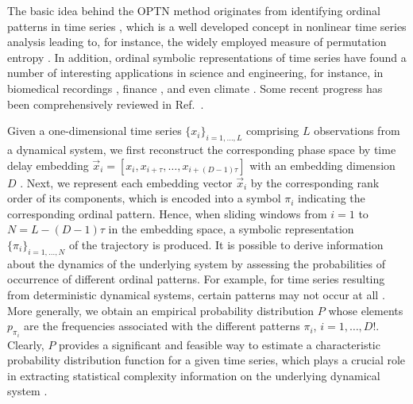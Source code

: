 \documentclass[12pt,aip,cha,reprint,nofootinbib]{revtex4-1}
\begin{document}
The basic idea behind the OPTN method originates from identifying ordinal patterns in time series \cite{BandtPRL2002}, which is a well developed concept in nonlinear time series analysis leading to, for instance, the widely employed measure of permutation entropy \cite{BandtPRL2002}. In addition, ordinal symbolic representations of time series have found a number of interesting applications in science and engineering, for instance, in biomedical recordings \cite{AmigoPTRSA2014}, finance \cite{ZaninChaos2008}, and even climate \cite{BarreiroChaos2011}. Some recent progress has been comprehensively reviewed in Ref.~\cite{AmigoPTRSA2014}. 

Given a one-dimensional time series $\{ x_i\}_{i=1, \ldots, L}$ comprising $L$ observations from a dynamical system, we first reconstruct the corresponding phase space by time delay embedding $\vec{x}_i = [x_i, x_{i+\tau}, \ldots, x_{i+(D-1)\tau}]$ with an embedding dimension $D$ \cite{Takens1981,Kantz97}. Next, we represent each embedding vector $\vec{x}_i$ by the corresponding rank order of its components, which is encoded into a symbol $\pi_{i}$ indicating the corresponding ordinal pattern. Hence, when sliding windows from $i=1$ to $N = L - (D - 1)\tau$ in the embedding space, a symbolic representation $\{\pi_i\}_{i=1, \ldots, N}$ of the trajectory is produced. It is possible to derive information about the dynamics of the underlying system by assessing the probabilities of occurrence of different ordinal patterns. For example, for time series resulting from deterministic dynamical systems, certain patterns may not occur at all \cite{AmigoEPL2007,AmigoEPL2008,ZaninChaos2008,RossoEPJB2012}. More generally, we obtain an empirical probability distribution $P$ whose elements $p_{\pi_{i}}$ are the frequencies associated with the different patterns $\pi_{i}$, $i = 1, \ldots, D!$. Clearly, $P$ provides a significant and feasible way to estimate a characteristic probability distribution function for a given time series, which plays a crucial role in extracting statistical complexity information on the underlying dynamical system \cite{BandtPRL2002,AmigoPTRSA2014}. 
\end{document}
